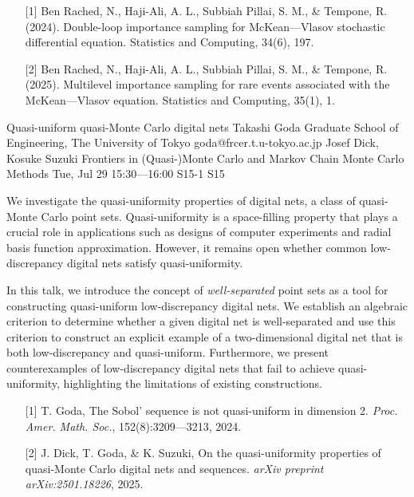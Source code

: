 \begin{talk}
\begin{enumerate}
 \item[{[1]}] Ben Rached, N., Haji-Ali, A. L., Subbiah Pillai, S. M., \& Tempone, R. (2024). Double-loop importance sampling for McKean---Vlasov stochastic differential equation. Statistics and Computing, 34(6), 197.
 \item[{[2]}] Ben Rached, N., Haji-Ali, A. L., Subbiah Pillai, S. M., \& Tempone, R. (2025). Multilevel importance sampling for rare events associated with the McKean---Vlasov equation. Statistics and Computing, 35(1), 1.
\end{enumerate}

\end{talk}

\begin{talk}
  {Quasi-uniform quasi-Monte Carlo digital nets}%
  {Takashi Goda}%
  {Graduate School of Engineering, The University of Tokyo}%
  {goda@frcer.t.u-tokyo.ac.jp}%
  {Josef Dick, Kosuke Suzuki}%
  {Frontiers in (Quasi-)Monte Carlo and Markov Chain Monte Carlo Methods}%
  {Tue, Jul 29 15:30---16:00}%
  {S15-1}%
  {S15}%
    
   
We investigate the quasi-uniformity properties of digital nets, a class of quasi-Monte Carlo point sets. Quasi-uniformity is a space-filling property that plays a crucial role in applications such as designs of computer experiments and radial basis function approximation. However, it remains open whether common low-discrepancy digital nets satisfy quasi-uniformity.

In this talk, we introduce the concept of \emph{well-separated} point sets as a tool for constructing quasi-uniform low-discrepancy digital nets. We establish an algebraic criterion to determine whether a given digital net is well-separated and use this criterion to construct an explicit example of a two-dimensional digital net that is both low-discrepancy and quasi-uniform. Furthermore, we present counterexamples of low-discrepancy digital nets that fail to achieve quasi-uniformity, highlighting the limitations of existing constructions.

\begin{enumerate}
 \item[{[1]}] T. Goda, The Sobol’ sequence is not quasi-uniform in dimension 2. \emph{Proc. Amer. Math. Soc.}, 152(8):3209---3213, 2024.
 \item[{[2]}] J. Dick, T. Goda, \& K. Suzuki, On the quasi-uniformity properties of quasi-Monte Carlo digital nets and sequences. \emph{arXiv preprint arXiv:2501.18226}, 2025.
\end{enumerate}
\end{talk}

